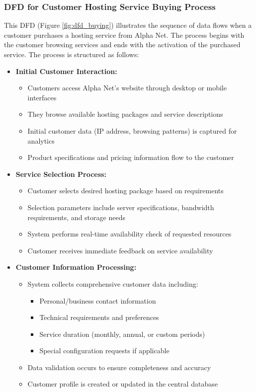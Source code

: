\subsubsection*{DFD for Customer Hosting Service Buying Process}
This DFD (Figure \ref{fig:dfd_buying}) illustrates the sequence of data flows when a customer purchases a hosting service from Alpha Net. The process begins with the customer browsing services and ends with the activation of the purchased service. The process is structured as follows:

\begin{itemize}
    \item \textbf{Initial Customer Interaction:}
    \begin{itemize}
        \item Customers access Alpha Net's website through desktop or mobile interfaces
        \item They browse available hosting packages and service descriptions
        \item Initial customer data (IP address, browsing patterns) is captured for analytics
        \item Product specifications and pricing information flow to the customer
    \end{itemize}

    \item \textbf{Service Selection Process:}
    \begin{itemize}
        \item Customer selects desired hosting package based on requirements
        \item Selection parameters include server specifications, bandwidth requirements, and storage needs
        \item System performs real-time availability check of requested resources
        \item Customer receives immediate feedback on service availability
    \end{itemize}

    \item \textbf{Customer Information Processing:}
    \begin{itemize}
        \item System collects comprehensive customer data including:
        \begin{itemize}
            \item Personal/business contact information
            \item Technical requirements and preferences
            \item Service duration (monthly, annual, or custom periods)
            \item Special configuration requests if applicable
        \end{itemize}
        \item Data validation occurs to ensure completeness and accuracy
        \item Customer profile is created or updated in the central database
    \end{itemize}


\end{itemize}
